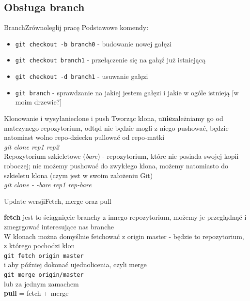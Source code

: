 \documentclass{beamer}
\begin{document}
\subsection{Obsługa branch}
\begin{frame}{Branch}{Zrównoleglij pracę}
 Podstawowe komendy:
 \begin{itemize}
  \item \texttt{git checkout -b branch0} - budowanie nowej gałęzi
  \item \texttt{git checkout  branch1} - przełączenie się na gałąź już istniejącą
  \item \texttt{git checkout -d branch1} - usuwanie gałęzi
  \item \texttt{git branch} - sprawdzanie na jakiej jestem gałęzi i jakie w ogóle istnieją [w moim drzewie?]
 \end{itemize}

\end{frame}

\begin{frame}{Klonowanie i wysyłanie}{clone i push}
  Tworząc klona, u\textbf{nie}zależniamy go od matczynego repozytorium, odtąd nie będzie mogli z niego pushować, będzie natomiast wolno
  repo-dziecku pullować od repo-matki\\
  \textit{git clone rep1 rep2} \\
  \vspace{2mm}
  Repozytorium szkieletowe (\textit{bare}) - repozytorium, które nie posiada swojej kopii roboczej; nie możemy pushować do zwykłego
  klona, 
  możemy natomiasto do szkieletu klona (czym jest w swoim założeniu Git) \\
  \textit{git clone - -bare rep1 rep-bare}
\end{frame}


\begin{frame}{Update wersji}{Fetch, merge oraz pull}

  \textbf{fetch} jest to ściągnięcie branchy z innego repozytorium, możemy je przeglądnąć i zmegrgować interesujące nas branche \\
  \vspace{3mm}
  W klonach można domyślnie fetchować z origin master - będzie to repozytorium, z którego pochodzi klon \\
  \texttt{git fetch origin master}\\
  i aby później dokonać ujednolicenia, czyli merge \\
  \texttt{git merge origin/master} \\
  \vspace{3mm}
  lub za jednym zamachem \\ 
  \textbf{pull} = fetch + merge

\end{frame}
\end{document}
